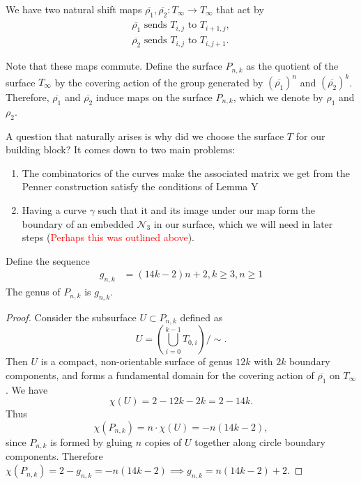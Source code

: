 We have two natural shift maps $\overline{\rho_1},\overline{\rho_2}: T_\infty \xrightarrow[]{} T_\infty$ that act by
\begin{gather*}
    \overline{\rho_1} \text{ sends } T_{i,j} \text{ to } T_{i+1,j}, \\
    \overline{\rho_2} \text{ sends } T_{i,j} \text{ to } T_{i,j+1}.
\end{gather*}

Note that these maps commute. Define the surface $P_{n,k}$ as the quotient of the surface $T_\infty$ by the covering action of the group generated by $(\overline{\rho_1})^n$ and $(\overline{\rho_2})^k$. Therefore, $\overline{\rho_1}$ and $\overline{\rho_2}$ induce maps on the surface $P_{n,k}$, which we denote by $\rho_1$ and $\rho_2$.

A question that naturally arises is why did we choose the surface $T$ for our building block? It comes down to two main problems:
\begin{enumerate}
    \item The combinatorics of the curves make the associated matrix we get from the Penner construction satisfy the conditions of Lemma Y
    \item Having a curve $\gamma$ such that it and its image under our map form the boundary of an embedded $\mathcal{N}_3$ in our surface, which we will need in later steps (\textcolor{red}{Perhaps this was outlined above}).
\end{enumerate}

\begin{lem}
Define the sequence
\begin{align*}
    g_{n,k} &= (14k - 2)n + 2, k \geq 3, n \geq 1
\end{align*}
    The genus of $P_{n,k}$ is $g_{n,k}$.
\end{lem}
\begin{proof}
    Consider the subsurface $U \subset P_{n,k}$ defined as $$U = \left( \bigcup_{i =0}^{k-1} T_{0,i} \right)/\sim.$$ Then $U$ is a compact, non-orientable surface of genus $12k$ with $2k$ boundary components, and forms a fundamental domain for the covering action of $\overline{\rho_1}$ on $T_\infty$. We have $$\chi(U) = 2 - 12k - 2k = 2 - 14k.$$ Thus $$\chi(P_{n,k}) = n \cdot \chi(U) = -n(14k - 2),$$ since $P_{n,k}$ is formed by gluing $n$ copies of $U$ together along circle boundary components. Therefore $\chi(P_{n,k}) = 2 - g_{n,k} = -n(14k - 2) \implies g_{n,k} = n(14k - 2) + 2$.
\end{proof}

